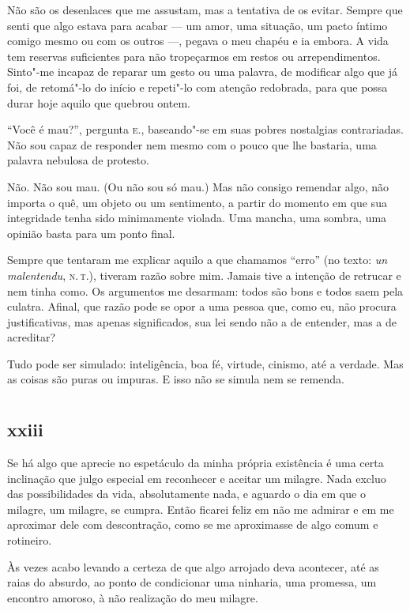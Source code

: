 \noindent{}Não são os desenlaces que me assustam, mas a tentativa de os evitar. Sempre que
senti que algo estava para acabar --- um amor, uma situação, um pacto
íntimo comigo mesmo ou com os outros ---, pegava o meu chapéu e ia embora.
A vida tem reservas suficientes para não tropeçarmos em restos ou
arrependimentos. Sinto"-me incapaz de reparar um gesto ou uma palavra, de
modificar algo que já foi, de retomá"-lo do início e repeti"-lo
com atenção redobrada, para que possa durar hoje aquilo que quebrou
ontem.

``Você é mau?'', pergunta \textsc{e.}, baseando"-se em suas pobres nostalgias
contrariadas. Não sou capaz de responder nem mesmo com o pouco que
lhe bastaria, uma palavra nebulosa de protesto.

Não. Não sou mau. (Ou não sou só mau.) Mas não consigo remendar algo,
não importa o quê, um objeto ou um sentimento, a partir do momento em
que sua integridade tenha sido minimamente violada. Uma mancha, uma
sombra, uma opinião basta para um ponto final.

Sempre que tentaram me explicar aquilo a que chamamos ``erro'' (no
texto: \textit{un malentendu}, \textsc{n.\,t.}), tiveram razão sobre mim. Jamais tive
a intenção de retrucar e nem tinha como. Os argumentos me desarmam:
todos são bons e todos saem pela culatra. Afinal, que razão pode se opor
a uma pessoa que, como eu, não procura justificativas, mas apenas
significados, sua lei sendo não a de entender, mas a de acreditar?

Tudo pode ser simulado: inteligência, boa fé, virtude, cinismo, até a
verdade. Mas as coisas são puras ou impuras. E isso não se simula nem 
se remenda. 

\chapter*{}
\section{xxiii}

\noindent{}Se há algo que aprecie no espetáculo da minha própria existência é
uma certa inclinação que julgo especial em reconhecer e aceitar um
milagre. Nada excluo das possibilidades da vida, absolutamente nada, e
aguardo o dia em que o milagre, um milagre, se cumpra. Então ficarei
feliz em não me admirar e em me aproximar dele com descontração, como se
me aproximasse de algo comum e rotineiro.

Às vezes acabo levando a certeza de que algo arrojado deva
acontecer, até as raias do absurdo, ao ponto de condicionar uma
ninharia, uma promessa, um encontro amoroso, à não realização do meu
milagre.

